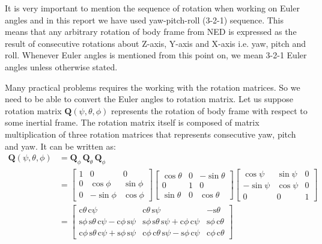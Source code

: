 \documentclass[12pt, a4paper]{article}
\begin{document}
It is very important to mention the sequence of rotation when working on Euler angles and in this report we have used yaw-pitch-roll (3-2-1) sequence. This means that any arbitrary rotation of body frame from NED is expressed as the result of consecutive rotations about Z-axis, Y-axis and X-axis i.e. yaw, pitch and roll. Whenever Euler angles is mentioned from this point on, we mean 3-2-1 Euler angles unless otherwise stated. \medskip

Many practical problems requires the working with the rotation matrices. So we need to be able to convert the Euler angles to rotation matrix. Let us suppose rotation matrix $\bm{Q}(\psi,\theta,\phi)$ represents the rotation of body frame with respect to some inertial frame. The rotation matrix itself is composed of matrix multiplication of three rotation matrices that represents consecutive yaw, pitch and yaw. It can be written as:
\begin{equation}
\begin{split}
\bm{Q}(\psi,\theta,\phi) &= \bm{Q}_{\phi}\,\bm{Q}_{\theta}\,\bm{Q}_{\phi} \\
&=
\begin{bmatrix}
1 & 0 & 0 \\
0 & \cos{\phi} & \sin{\phi} \\
0 & -\sin{\phi} & \cos{\phi}
\end{bmatrix}
\begin{bmatrix}
\cos{\theta} & 0 & -\sin{\theta} \\
0 & 1 & 0 \\
\sin{\theta} & 0 & \cos{\theta}
\end{bmatrix}
\begin{bmatrix}
\cos{\psi} & \sin{\psi} & 0 \\
-\sin{\psi} & \cos{\psi} & 0 \\
0 & 0 & 1
\end{bmatrix} \\
&= \begin{bmatrix}
\text{c}\theta\,\text{c}\psi & \text{c}\theta\,\text{s}\psi & -\text{s}\theta \\
\text{s}\phi\,\text{s}\theta\,\text{c}\psi - \text{c}\phi\,\text{s}\psi & \text{s}\phi\,\text{s}\theta\,\text{s}\psi + \text{c}\phi\,\text{c}\psi & \text{s}\phi\,\text{c}\theta \\
\text{c}\phi\,\text{s}\theta\,\text{c}\psi + \text{s}\phi\,\text{s}\psi & \text{c}\phi\,\text{c}\theta\,\text{s}\psi -\text{s}\phi\,\text{c}\psi & \text{c}\phi\,\text{c}\theta
\end{bmatrix}
\end{split}
\end{equation}
\end{document}
